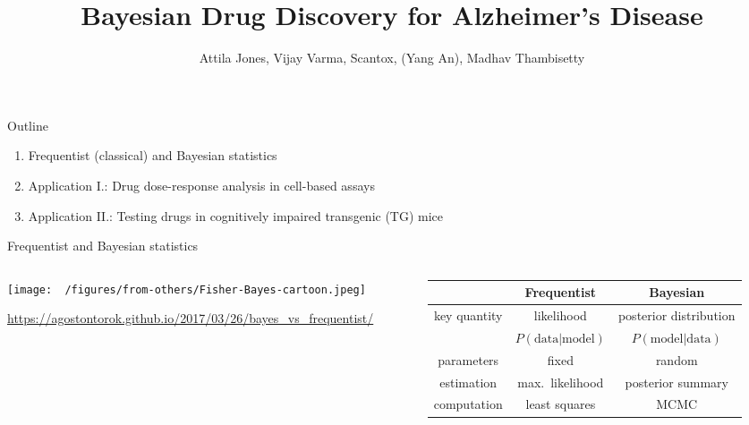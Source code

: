 \documentclass[aspectratio=169]{beamer}
\title{Bayesian Drug Discovery for Alzheimer's Disease}
\subtitle{}
\author{Attila Jones, Vijay Varma, Scantox, (Yang An), Madhav Thambisetty}
\date{}
\begin{document}
\titlepage

\begin{frame}{Outline}
  \begin{enumerate}
    \item Frequentist (classical) and Bayesian statistics
    \item Application I.: Drug dose-response analysis in cell-based assays
    \item Application II.: Testing drugs in cognitively impaired transgenic (TG) mice
  \end{enumerate}
\end{frame}

\begin{frame}{Frequentist and Bayesian statistics}
  \footnotesize
\begin{columns}[t]
\begin{column}{0.45\textwidth}

\texttt{[image: ~/figures/from-others/Fisher-Bayes-cartoon.jpeg]}

  \tiny{\url{https://agostontorok.github.io/2017/03/26/bayes_vs_frequentist/}}
\end{column}

\begin{column}{0.55\textwidth}

  \begin{tabular}{c|c|c}
    & Frequentist & Bayesian \\
    \hline
    key quantity & likelihood & posterior distribution \\
                 & $P(\mathrm{data} | \mathrm{model})$ & $P(\mathrm{model} | \mathrm{data})$ \\
    \hline
    parameters & fixed & random \\
    \hline
    estimation & max.~likelihood & posterior summary \\
    \hline
    computation & least squares & MCMC \\
  \end{tabular}

\end{column}
\end{columns}
\end{frame}
\end{document}
